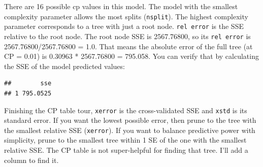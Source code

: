 \documentclass[]{book}
\newenvironment{Shaded}{\begin{snugshade}}{\end{snugshade}}
\newcommand{\DataTypeTok}[1]{\textcolor[rgb]{0.13,0.29,0.53}{#1}}
\newcommand{\DecValTok}[1]{\textcolor[rgb]{0.00,0.00,0.81}{#1}}
\newcommand{\KeywordTok}[1]{\textcolor[rgb]{0.13,0.29,0.53}{\textbf{#1}}}
\newcommand{\NormalTok}[1]{#1}
\newcommand{\OperatorTok}[1]{\textcolor[rgb]{0.81,0.36,0.00}{\textbf{#1}}}
\newcommand{\StringTok}[1]{\textcolor[rgb]{0.31,0.60,0.02}{#1}}
\begin{document}
There are 16 possible cp values in this model. The model with the smallest complexity parameter allows the most splits (\texttt{nsplit}). The highest complexity parameter corresponds to a tree with just a root node. \texttt{rel\ error} is the SSE relative to the root node. The root node SSE is 2567.76800, so its \texttt{rel\ error} is 2567.76800/2567.76800 = 1.0. That means the absolute error of the full tree (at CP = 0.01) is 0.30963 * 2567.76800 = 795.058. You can verify that by calculating the SSE of the model predicted values:

\begin{Shaded}
\end{Shaded}

\begin{verbatim}
##        sse
## 1 795.0525
\end{verbatim}

Finishing the CP table tour, \texttt{xerror} is the cross-validated SSE and \texttt{xstd} is its standard error. If you want the lowest possible error, then prune to the tree with the smallest relative SSE (\texttt{xerror}). If you want to balance predictive power with simplicity, prune to the smallest tree within 1 SE of the one with the smallest relative SSE. The CP table is not super-helpful for finding that tree. I'll add a column to find it.
\end{document}
